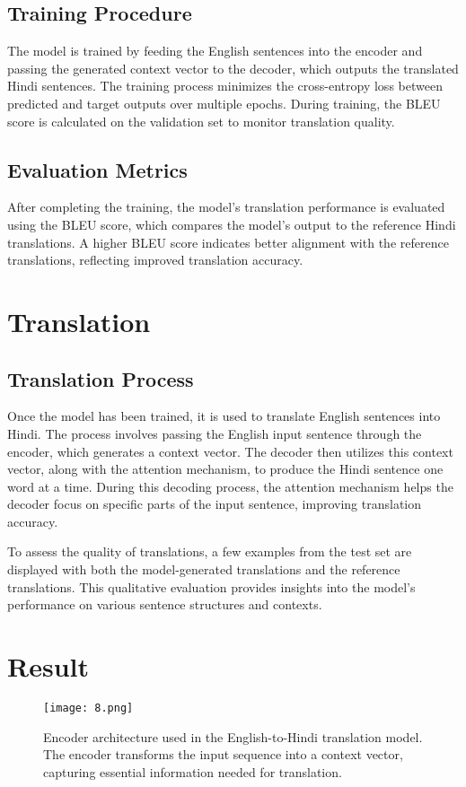 \documentclass[12pt]{article}
\begin{document}
\subsection{Training Procedure}
The model is trained by feeding the English sentences into the encoder and passing the generated context vector to the decoder, which outputs the translated Hindi sentences. The training process minimizes the cross-entropy loss between predicted and target outputs over multiple epochs. During training, the BLEU score is calculated on the validation set to monitor translation quality.

\subsection{Evaluation Metrics}
After completing the training, the model's translation performance is evaluated using the BLEU score, which compares the model's output to the reference Hindi translations. A higher BLEU score indicates better alignment with the reference translations, reflecting improved translation accuracy.

\section{Translation}

\subsection{Translation Process}
Once the model has been trained, it is used to translate English sentences into Hindi. The process involves passing the English input sentence through the encoder, which generates a context vector. The decoder then utilizes this context vector, along with the attention mechanism, to produce the Hindi sentence one word at a time. During this decoding process, the attention mechanism helps the decoder focus on specific parts of the input sentence, improving translation accuracy.

To assess the quality of translations, a few examples from the test set are displayed with both the model-generated translations and the reference translations. This qualitative evaluation provides insights into the model’s performance on various sentence structures and contexts.

\section{Result}
\begin{figure}[h!]
    \centering
    \texttt{[image: 8.png]} %
    \caption{Encoder architecture used in the English-to-Hindi translation model. The encoder transforms the input sequence into a context vector, capturing essential information needed for translation.}
    \label{fig:encoder_architecture}
\end{figure}
\end{document}
